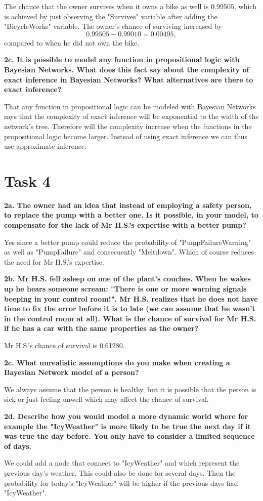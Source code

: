 \documentclass[a4paper,10pt]{article}
\begin{document}
 The chance that the owner survives when it owns a bike as well is 0.99505, which is achieved by just observing the "Survives" variable after adding the
 "BicycleWorks" variable.
 The owner's chance of surviving increased by 
 \begin{equation*}
	0.99505 - 0.99010 = 0.00495,
 \end{equation*} compared to when he did not own the bike.

 \textbf{2c. It is possible to model any function in propositional logic with Bayesian Networks. 
 What does this fact say about the complexity of exact inference in Bayesian Networks? 
 What alternatives are there to exact inference?}

 That any function in propositional logic can be modeled with Bayesian Networks says that the
 complexity of exact inference will be exponential to the width of the network's tree.
 Therefore will the complexity increase when the functions in the propositional logic
 become larger. Instead of using exact inference we can thus use approximate inference.

 \section{Task 4}

 \textbf{2a. The owner had an idea that instead of employing a safety person, to replace the pump with a better one. 
 Is it possible, in your model, to compensate for the lack of Mr H.S.'s expertise with a better pump?}

 Yes since a better pump could reduce the probability of "PumpFailureWarning" as 
 well as "PumpFailure" and consecuently "Meltdown".
 Which of course reduces the need for Mr H.S.'s expertise. 

 \textbf{2b. Mr H.S. fell asleep on one of the plant's couches. 
 When he wakes up he hears someone scream: "There is one or more warning signals beeping in your control room!". 
 Mr H.S. realizes that he does not have time to fix the error before it is to late (we can assume that he wasn't in the control room at all). 
 What is the chance of survival for Mr H.S. if he has a car with the same properties as the owner?}

 Mr H.S.'s chance of survival is 0.61280.

 \textbf{2c. What unrealistic assumptions do you make when creating a Bayesian Network model of a person?}

 We always assume that the person is healthy, but it is possible that the person is sick or just feeling unwell which may affect the chance of survival. 

\textbf{2d. Describe how you would model a more dynamic world where for example the "IcyWeather" is more likely to be true the next day if it was true the day before. 
You only have to consider a limited sequence of days.}

We could add a node that connect to "IcyWeather" and which represent the previous day's weather.
This could also be done for several days.
Then the probability for today's "IcyWeather" will be higher if the previous days had "IcyWeather".
\end{document}
